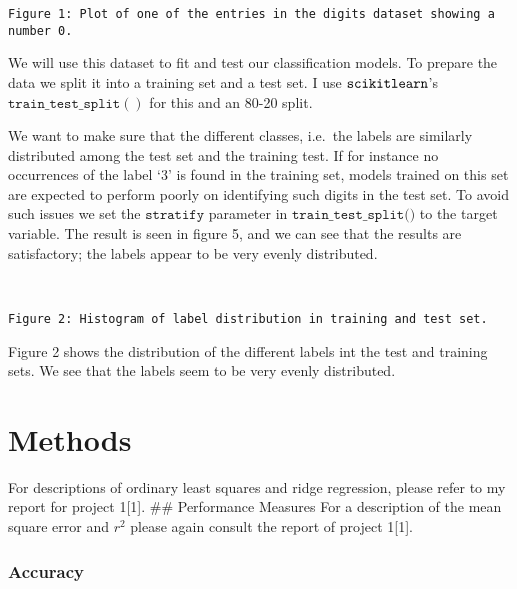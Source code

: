 \documentclass[11pt]{article}
\begin{document}
    \begin{Verbatim}[commandchars=\\\{\}]
Figure 1: Plot of one of the entries in the digits dataset showing a number 0.
    \end{Verbatim}

    We will use this dataset to fit and test our classification models. To
prepare the data we split it into a training set and a test set. I use
\(\texttt{scikit\-learn}\)'s \(\texttt{train\_test\_split}()\) for this and
an 80-20 split.


    We want to make sure that the different classes, i.e.~the labels are
similarly distributed among the test set and the training test. If for
instance no occurrences of the label `3' is found in the training set,
models trained on this set are expected to perform poorly on identifying
such digits in the test set. To avoid such issues we set the
\(\texttt{stratify}\) parameter in \(\texttt{train\_test\_split()}\) to
the target variable. The result is seen in figure 5, and we can see that
the results are satisfactory; the labels appear to be very evenly
distributed.


    \begin{center}
    \end{center}
    { \hspace*{\fill} \\}
    
    \begin{Verbatim}[commandchars=\\\{\}]
Figure 2: Histogram of label distribution in training and test set.
    \end{Verbatim}

    Figure 2 shows the distribution of the different labels int the test and
training sets. We see that the labels seem to be very evenly
distributed.

    \hypertarget{methods}{%
\section{Methods}\label{methods}}

For descriptions of ordinary least squares and ridge regression, please
refer to my report for project 1{[}1{]}. \#\# Performance Measures For a
description of the mean square error and \(r^2\) please again consult
the report of project 1{[}1{]}.

\hypertarget{accuracy}{%
\subsubsection{Accuracy}\label{accuracy}}
\end{document}
